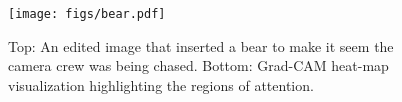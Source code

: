




% 



\begin{figure}[t]
    \centering
    \texttt{[image: figs/bear.pdf]}
    \caption{Top: An edited image that inserted a bear to make it seem the camera crew was being chased. Bottom: Grad-CAM heat-map visualization highlighting the regions of attention.}
    \label{fig:bear_camera_crew}
\end{figure}



